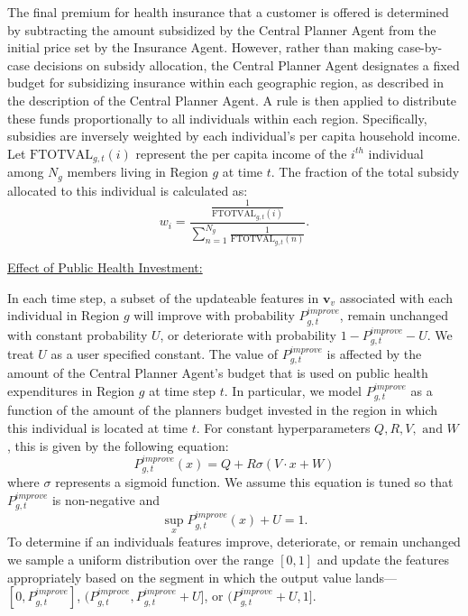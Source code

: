 The final premium for health insurance that a customer is offered is determined by subtracting the amount subsidized by the Central Planner Agent from the initial price set by the Insurance Agent. However, rather than making case-by-case decisions on subsidy allocation, the Central Planner Agent designates a fixed budget for subsidizing insurance within each geographic region, as described in the description of the Central Planner Agent. A rule is then applied to distribute these funds proportionally to all individuals within each region. Specifically, subsidies are inversely weighted by each individual's per capita household income. Let $\text{FTOTVAL}_{g,t}(i)$ represent the per capita income of the 
$i^{th}$  individual among $N_g$ members living in Region $g$ at time $t$. The fraction of the total subsidy allocated to this individual is calculated as:
\begin{equation}
    w_i = \frac{\frac{1}{\text{FTOTVAL}_{g,t}(i)}}{\sum_{n=1}^{N_g} \frac{1}{\text{FTOTVAL}_{g,t}(n)}}.
\end{equation}

\underline{Effect of Public Health Investment:}

In each time step, a subset of the updateable features in $\mathbf{v}_v$ associated with each individual in Region $g$ will improve with probability $P_{g,t}^{improve}$, remain unchanged with constant probability $U$, or deteriorate with probability $1-P_{g,t}^{improve}-U$. We treat $U$ as a user specified constant. The value of $P_{g,t}^{improve}$ is affected by the amount of the Central Planner Agent's budget that is used on public health expenditures in Region $g$ at time step $t$. In particular, we model $P_{g,t}^{improve}$ as a function of the amount of the planners budget invested in the region in which this individual is located at time $t$. For constant hyperparameters $Q,R,V, \text{ and } W$, this is given by the following equation:
\begin{equation}
    \label{eq:improve_function}
    P_{g,t}^{improve}(x) = Q + R\sigma(V\cdot x + W)
\end{equation}
where $\sigma$ represents a sigmoid function. We assume this equation is tuned so that $P_{g,t}^{improve}$ is non-negative and 
\begin{equation}
    \sup_{x} P_{g,t}^{improve}(x) + U= 1.
\end{equation}
To determine if an individuals features improve, deteriorate, or remain unchanged we sample a uniform distribution over the range $[0,1]$ and update the features appropriately based on the segment in which the output value lands---$[0,P_{g,t}^{improve}]$, $(P_{g,t}^{improve},P_{g,t}^{improve}+U]$, or $(P_{g,t}^{improve}+U,1]$.


